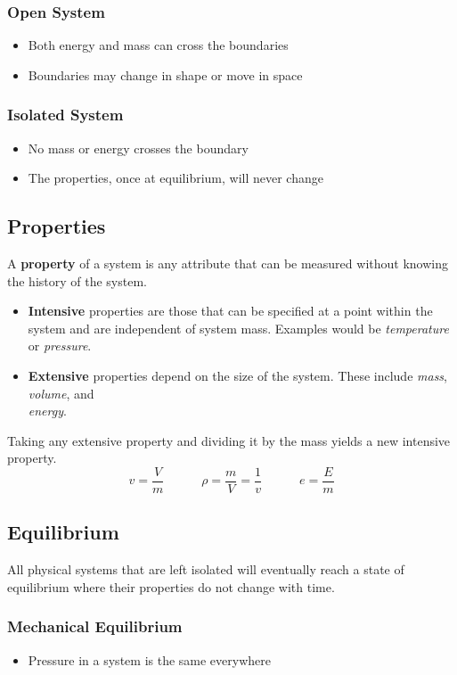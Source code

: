 \documentclass[11pt]{article}
\begin{document}
\subsubsection{Open System}
\begin{itemize}
\item Both energy and mass can cross the boundaries
\item Boundaries may change in shape or move in space
\end{itemize}
\subsubsection{Isolated System}
\begin{itemize}
\item No mass or energy crosses the boundary
\item The properties, once at equilibrium, will never change
\end{itemize}
\subsection{Properties}
A \textbf{property} of a system is any attribute that can be measured without knowing the history of the system.
\begin{itemize}
\item \textbf{Intensive} properties are those that can be specified at a point within the system and are independent of system mass. Examples would be \textit{temperature} or \textit{pressure}. 
\item \textbf{Extensive} properties depend on the size of the system. These include \textit{mass}, \textit{volume}, and \\ \textit{energy}.
\end{itemize}
Taking any extensive property and dividing it by the mass yields a new intensive property. 
$$ v = \frac{V}{m} \quad \quad \quad \rho = \frac{m}{V} = \frac{1}{v} \quad \quad \quad e = \frac{E}{m}$$
\subsection{Equilibrium}
All physical systems that are left isolated will eventually reach a state of equilibrium where their properties do not change with time. 
\subsubsection{Mechanical Equilibrium}
\begin{itemize}
\item Pressure in a system is the same everywhere
\end{itemize}
\end{document}
